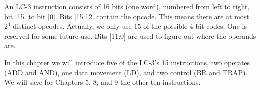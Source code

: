 \documentclass{patt}
\begin{document}
An LC-3 instruction consists of 16 bits (one word), numbered
from left to right, bit [15] to bit [0].  Bits [15:12] contain the opcode.
This means there are at most $2^4$ distinct opcodes.  Actually, we only use
15 of the possible 4-bit codes.  One is reserved for some future use.  
Bits [11:0] are used to figure out where the operands are.  

In this chapter we will introduce five of the LC-3's 15 instructions, two
operates (ADD and AND), one data movement (LD), and two control (BR and TRAP).
We will save for Chapters 5, 8, and 9 the other ten instructions. 

\medskip

\begingroup
\makeatletter
\renewenvironment{example}{%
  \refstepcounter{example}%
  \begin{colourframed}%
    \def\@mathmargin{\z@}
    \let\enumargs\exenumargs
    \vspace*{-2\p@}%
    \rlap{\hspace*{29pc}\hbox{\hspace*{-\fboxsep}%
      \setlength{\fboxsep}{\z@}%
      {\colorbox{SPOThundred}{\vbox to 13\p@{%
          \vss\hbox to 7pc{\hss
          \color{white}\sansbold\fontsize{10}{12}\selectfont
          Example~\theexample\hss}\vss}}}}}%
  \normalfont\fontsize{9.5}{11}\selectfont
  \rightskip7.5pc\advance\rightskip by \fboxsep
  \leftskip3\p@
  \parindent1.5pc\@afterheading\@afterindentfalse
  \vspace*{-14.5\p@}}%
{\par\unskip\removelastskip\offinterlineskip\vspace{4\p@}\end{colourframed}}
\makeatother
\end{document}
